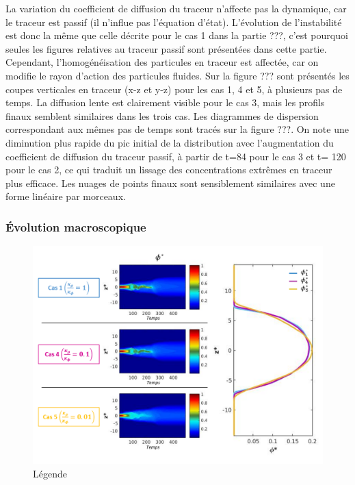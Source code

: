 \documentclass[a4paper,12pt]{article}
\begin{document}
    La variation du coefficient de diffusion du traceur n'affecte pas la dynamique, car le traceur est passif (il n'influe pas l'équation d'état). L'évolution de l'instabilité est donc la même que celle décrite pour le cas 1 dans la partie ???, c'est pourquoi seules les figures relatives au traceur passif sont présentées dans cette partie. Cependant, l'homogénéisation des particules en traceur est affectée, car on modifie le rayon d'action des particules fluides. Sur la figure ??? sont présentés les coupes verticales en traceur (x-z et y-z) pour les cas 1, 4 et 5, à plusieurs pas de temps. La diffusion lente est clairement visible pour le cas 3, mais les profils finaux semblent similaires dans les trois cas. Les diagrammes de dispersion correspondant aux mêmes pas de temps sont tracés sur la figure ???. On note une diminution plus rapide du pic initial de la distribution avec l'augmentation du coefficient de diffusion du traceur passif, à partir de t=84 pour le cas 3 et t= 120 pour le cas 2, ce qui traduit un lissage des concentrations extrêmes en traceur plus efficace. Les nuages de points finaux sont sensiblement similaires avec une forme linéaire par morceaux.
    
    \subsubsection{Évolution macroscopique}
    
    \begin{figure}[!h]
        \centering
        \label{scatterplot_phi}
        \includegraphics[width=1\linewidth]{figures/phidiff_star.png}
        \caption{Légende}
    \end{figure}
    
\end{document}
